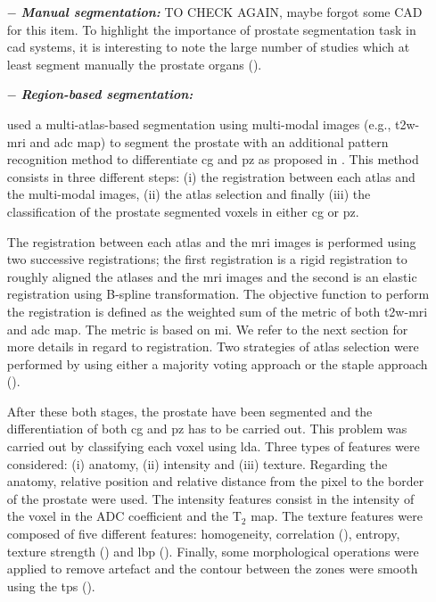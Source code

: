 \begin{enumerate}[leftmargin=*]

\item[$-$] \textbf{\textit{Manual segmentation:}} {\color{red} TO CHECK AGAIN, maybe forgot some CAD for this item.} To highlight the importance of prostate segmentation task in \ac{cad} systems, it is interesting to note the large number of studies which at least segment manually the prostate organs (\cite{Artan2009,Artan2010,Matulewicz2013,Niaf2011,Niaf2012,Ozer2009,Ozer2010,Puech2009,Vos2008,Vos2008a}).

\item[$-$] \textbf{\textit{Region-based segmentation:}}

\cite{Litjens2012} used a multi-atlas-based segmentation using multi-modal images (e.g., \ac{t2w}-\ac{mri} and \ac{adc} map) to segment the prostate with an additional pattern recognition method to differentiate \ac{cg} and \ac{pz} as proposed in \cite{Litjens2012a}. This method consists in three different steps: (i) the registration between each atlas and the multi-modal images, (ii) the atlas selection and finally (iii) the classification of the prostate segmented voxels in either \ac{cg} or \ac{pz}. 

The registration between each atlas and the \ac{mri} images is performed using two successive registrations; the first registration is a rigid registration to roughly aligned the atlases and the \ac{mri} images and the second is an elastic registration using B-spline transformation. The objective function to perform the registration is defined as the weighted sum of the metric of both \ac{t2w}-\ac{mri} and \ac{adc} map. The metric is based on \ac{mi}. We refer to the next section for more details in regard to registration. Two strategies of atlas selection were performed by using either a majority voting approach or the \ac{staple} approach (\cite{Warfield2004}).

After these both stages, the prostate have been segmented and the differentiation of both \ac{cg} and \ac{pz} has to be carried out. This problem was carried out by classifying each voxel using \ac{lda}. Three types of features were considered: (i) anatomy, (ii) intensity and (iii) texture. Regarding the anatomy, relative position and relative distance from the pixel to the border of the prostate were used. The intensity features consist in the intensity of the voxel in the ADC coefficient and the T$_2$ map. The texture features were composed of five different features: homogeneity, correlation (\cite{Amadasun1989}), entropy, texture strength (\cite{Li2005a}) and \ac{lbp} (\cite{Ojala1996}). Finally, some morphological operations were applied to remove artefact and the contour between the zones were smooth using the \ac{tps} (\cite{Bookstein1989}).


\end{enumerate}
